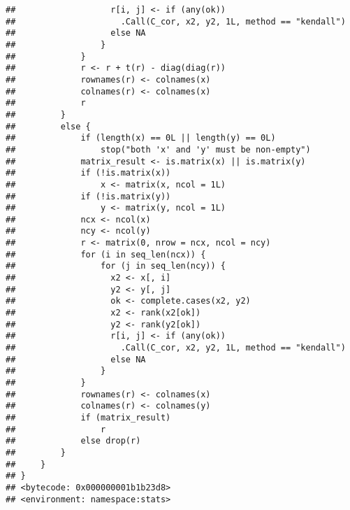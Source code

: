 \documentclass[]{article}
\begin{document}
\begin{verbatim}
##                   r[i, j] <- if (any(ok)) 
##                     .Call(C_cor, x2, y2, 1L, method == "kendall")
##                   else NA
##                 }
##             }
##             r <- r + t(r) - diag(diag(r))
##             rownames(r) <- colnames(x)
##             colnames(r) <- colnames(x)
##             r
##         }
##         else {
##             if (length(x) == 0L || length(y) == 0L) 
##                 stop("both 'x' and 'y' must be non-empty")
##             matrix_result <- is.matrix(x) || is.matrix(y)
##             if (!is.matrix(x)) 
##                 x <- matrix(x, ncol = 1L)
##             if (!is.matrix(y)) 
##                 y <- matrix(y, ncol = 1L)
##             ncx <- ncol(x)
##             ncy <- ncol(y)
##             r <- matrix(0, nrow = ncx, ncol = ncy)
##             for (i in seq_len(ncx)) {
##                 for (j in seq_len(ncy)) {
##                   x2 <- x[, i]
##                   y2 <- y[, j]
##                   ok <- complete.cases(x2, y2)
##                   x2 <- rank(x2[ok])
##                   y2 <- rank(y2[ok])
##                   r[i, j] <- if (any(ok)) 
##                     .Call(C_cor, x2, y2, 1L, method == "kendall")
##                   else NA
##                 }
##             }
##             rownames(r) <- colnames(x)
##             colnames(r) <- colnames(y)
##             if (matrix_result) 
##                 r
##             else drop(r)
##         }
##     }
## }
## <bytecode: 0x000000001b1b23d8>
## <environment: namespace:stats>
\end{verbatim}
\end{document}

